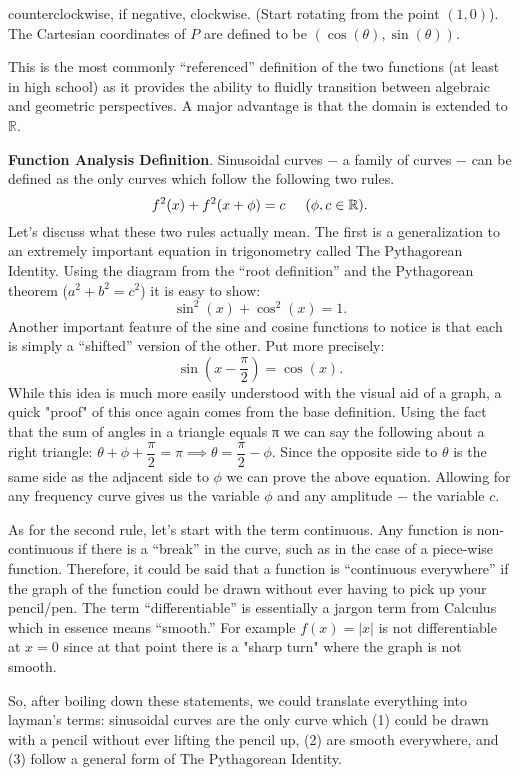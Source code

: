 \documentclass[lang=en,11pt]{elegantbook}
\begin{document}
\noindent counterclockwise, if negative, clockwise.  (Start rotating from the point $(1,0)$). The Cartesian coordinates of $P$ are defined to be $(\cos(\theta),\sin(\theta))$.

This is the most commonly “referenced” definition of the two functions (at least in high school) as it provides the ability to fluidly transition between algebraic and geometric perspectives. A major advantage is that the domain is extended to $\mathbb{R}$.

\textbf{Function Analysis Definition}. Sinusoidal curves $-$ a family of curves $-$ can be defined as the only curves which follow the following two rules. $$f^2(x)+f^2(x+\phi)=c \hspace{5mm} (\phi,c\in\mathbb{R}).$$
Let’s discuss what these two rules actually mean. The first is a generalization to an extremely important equation in trigonometry called The Pythagorean Identity. Using the diagram from the “root definition” and the Pythagorean theorem ($a^2+b^2=c^2$) it is easy to show: $$\sin^2(x)+\cos^2(x)=1.$$
Another important feature of the sine and cosine functions to notice is that each is simply a “shifted” version of the other. Put more precisely: $$\sin\left(x-\dfrac{\pi}{2}\right)=\cos(x).$$
While this idea is much more easily understood with the visual aid of a graph, a quick "proof" of this once again comes from the base definition. Using the fact that the sum of angles in a triangle equals π we can say the following about a right triangle: $\theta+\phi+\dfrac{\pi}{2}=\pi \implies \theta=\dfrac{\pi}{2}-\phi$. Since the opposite side to $\theta$ is the same side as the adjacent side to $\phi$ we can prove the above equation. Allowing for any frequency curve gives us the variable $\phi$ and any amplitude $-$ the variable $c$.

As for the second rule, let’s start with the term continuous. Any function is non-continuous if there is a “break” in the curve, such as in the case of a piece-wise function. Therefore, it could be said that a function is “continuous everywhere” if the graph of the function could be drawn without ever having to pick up your pencil/pen. The term “differentiable” is essentially a jargon term from Calculus which in essence means “smooth.” For example $f(x)=|x|$ is not differentiable at $x=0$ since at that point there is a "sharp turn" where the graph is not smooth.

So, after boiling down these statements, we could translate everything into layman’s terms: sinusoidal curves are the only curve which (1) could be drawn with a pencil without ever lifting the pencil up, (2) are smooth everywhere, and (3) follow a general form of The Pythagorean Identity.
\end{document}
